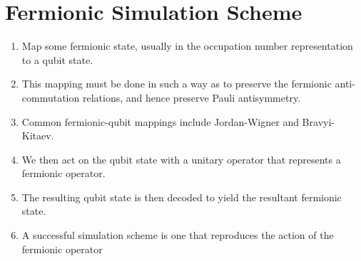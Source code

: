 \section{Fermionic Simulation Scheme}

\begin{enumerate}
    \item Map some fermionic state, usually in the occupation number representation to a qubit state.
    \item This mapping must be done in such a way as to preserve the fermionic anti-commutation relations, and hence preserve Pauli antisymmetry.
    \item Common fermionic-qubit mappings include Jordan-Wigner and Bravyi-Kitaev.
    \item We then act on the qubit state with a unitary operator that represents a fermionic operator.
    \item The resulting qubit state is then decoded to yield the resultant fermionic state.
    \item A successful simulation scheme is one that reproduces the action of the fermionic operator
\end{enumerate}

